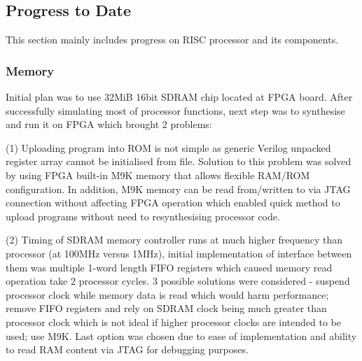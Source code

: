 \documentclass[a4paper,12pt]{article}
\begin{document}
\begin{multicols}{2}

\subsection{Progress to Date}
This section mainly includes progress on RISC processor and its components.

\subsubsection{Memory} \label{sec:memory}
Initial plan was to use 32MiB 16bit SDRAM chip located at FPGA board. After successfully simulating most of processor functions, next step was to synthesise and run it on FPGA which brought 2 problems: 

(1) Uploading program into ROM is not simple as generic Verilog unpacked register array cannot be initialised from file. Solution to this problem was solved by using FPGA built-in M9K memory that allows flexible RAM/ROM configuration. In addition, M9K memory can be read from/written to via JTAG connection without affecting FPGA operation which enabled quick method to upload programs without need to resynthesising processor code.

(2) Timing of SDRAM memory controller runs at much higher frequency than processor (at 100MHz versus 1MHz), initial implementation of interface between them was multiple 1-word length FIFO registers which caused memory read operation take 2 processor cycles. 3 possible solutions were considered - suspend processor clock while memory data is read which would harm performance; remove FIFO registers and rely on SDRAM clock being much greater than processor clock which is not ideal if higher processor clocks are intended to be used; use M9K. Last option was chosen due to ease of implementation and ability to read RAM content via JTAG for debugging purposes.


\end{multicols}
\end{document}
